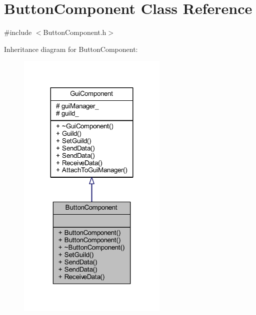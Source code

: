\hypertarget{class_button_component}{}\section{Button\+Component Class Reference}
\label{class_button_component}


{\ttfamily \#include $<$Button\+Component.\+h$>$}



Inheritance diagram for Button\+Component\+:
\nopagebreak
\begin{figure}[H]
\begin{center}
\leavevmode
\includegraphics[width=203pt]{class_button_component__inherit__graph}
\end{center}
\end{figure}


